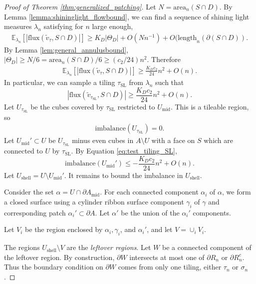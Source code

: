 \documentclass[10pt,a4paper]{amsart}
\newcommand{\m}[1]{\mathbb{#1}}
\begin{document}
\begin{proof}[Proof of Theorem \ref{thm:generalized_patching}]
    Let $N = \text{area}_n(S\cap D)$. By Lemma \ref{lemma:shininglight_flowbound}, we can find a sequence of shining light measures $\lambda_n$ satisfying for $n$ large enough, 
    \begin{align*}
        \m E_{\lambda_n}[|\text{flux}(\widetilde v_\tau,S\cap D)|]\geq K_D |\Theta_D|+O(N n^{-1}) + O(\text{length}_n(\partial(S\cap D)). 
    \end{align*}
    By Lemma \ref{lem:general_annulusbound}, $|\Theta_D|\geq N/6 = \text{area}_n(S\cap D)/6\geq ( c_2 /24 ) n^2$. Therefore 
    \begin{align*}
        \m E_{\lambda_n}[|\text{flux}(\widetilde v_\tau,S\cap D)|] \geq \frac{K_D c_2}{24}n^2 + O(n).
    \end{align*}
    In particular, we can sample a tiling $\tau_{\text{SL}}$ from $\lambda_n$ such that 
    \begin{equation}\label{eq:test_tiling_SL}
        |\text{flux}(\widetilde v_{\tau_{\text{SL}}},S\cap D)| \geq \frac{K_D c_2}{24}n^2 + O(n).
    \end{equation}
    Let $U_{\tau_{\text{SL}}}$ be the cubes covered by $\tau_{\text{SL}}$ restricted to $U_{\text{mid}}$. This is a tileable region, so 
    \begin{align*}
        \text{imbalance}(U_{\tau_{\text{SL}}}) = 0. 
    \end{align*}
    Let $U_{\text{mid}}'\subset U$ be $U_{\tau_{\text{SL}}}$ minus even cubes in $A\setminus U$ with a face on $S$ which are connected to $U$ by $\tau_{\text{SL}}$. By Equation \eqref{eq:test_tiling_SL}, 
    \begin{equation}\label{eq:imbalance_mid}
        \text{imbalance}(U_{\text{mid}}') \leq -\frac{K_D c_2}{24}n^2 + O(n).
    \end{equation}
    Let $U_{\text{shell}} = U\setminus U_{\text{mid}}'$. It remains to bound the imbalance in $U_{\text{shell}}$.
    
    Consider the set $\alpha = U\cap \partial A_{\text{mid}}$. 
    For each connected component $\alpha_i$ of $\alpha$, we form a closed surface using a cylinder ribbon surface component $\gamma_i$ of $\gamma$ and corresponding patch $\alpha_i'\subset \partial A$. Let $\alpha'$ be the union of the $\alpha_i'$ components. 

     Let $V_i$ be the region enclosed by $\alpha_i,\gamma_i$, and $\alpha_i'$, and let $V = \cup_i V_i$. 

     The regions $U_{\text{shell}}\setminus V$ are the \textit{leftover regions}. Let $W$ be a connected component of the leftover region. By construction, $\partial W$ intersects at most one of $\partial R_n$ or $\partial R^c_n$. Thus the boundary condition on $\partial W$ comes from only one tiling, either $\tau_n$ or $\sigma_n$. 


\end{proof}
\end{document}
